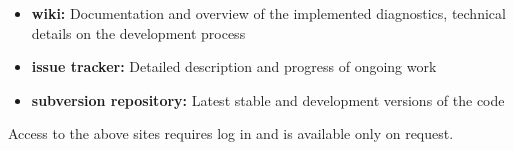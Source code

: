 \documentclass[12pt]{article}
\begin{document}
\begin{itemize}
\item{\textbf{wiki:} } Documentation and overview of the implemented
diagnostics, technical details on the development
process\cite{ESMValTool_wiki}
\item{\textbf{issue tracker:} } Detailed description and progress of
ongoing work\cite{ESMValTool_issues}
\item{\textbf{subversion repository:} } Latest stable and development
versions of the code\cite{ESMValTool_repo}
\end{itemize}
Access to the above sites requires log in and is available only on request.



% 
% 
\end{document}
